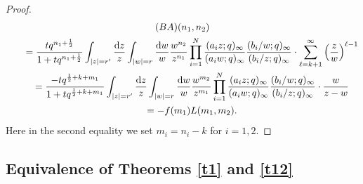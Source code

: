 \documentclass[pdftex]{sigma}
\numberwithin{equation}{section}
\def\i{\infty}
\begin{document}
\begin{proof}
\begin{gather*}
(BA)(n_1,n_2)
\\
\qquad=
\frac{t q^{n_1+\frac12}}{1+t q^{n_1+\frac12}}
\int_{|z|=r'}\frac{{\rm d}z}{z}
\int_{|w|=r}\frac{{\rm d}w}{w}
\frac{w^{n_2}}{z^{n_1}}
\prod_{i=1}^N
\frac{(a_iz;q)_\i}{(a_i w;q)_{\i}}
\frac{(b_i/w;q)_\i}{(b_i/z;q)_{\i}}
\cdot
\sum_{\ell=k+1}^{\i}\left(\frac{z}{w}\right)^{\ell-1}
\\
\qquad=
\frac{-t q^{\frac12+k+m_1}}{1+t q^{\frac12+k+m_1}}
\int_{|z|=r'}\frac{{\rm d}z}{z}
\int_{|w|=r}\frac{{\rm d}w}{w}
\frac{w^{m_2}}{z^{m_1}}
\prod_{i=1}^N
\frac{(a_iz;q)_\i}{(a_i w;q)_{\i}}
\frac{(b_i/w;q)_\i}{(b_i/z;q)_{\i}}
\cdot
\frac{w}{z-w}
\\
\qquad=
-f(m_1)L(m_1,m_2).
\end{gather*}
Here in the second equality we set $m_i=n_i-k$ for $i=1,2$.
\end{proof}



\subsection[Equivalence of Theorems 1.1 and 1.3]{Equivalence of Theorems \ref{t1} and \ref{t12}}
\label{s23}
\end{document}
